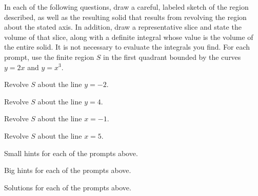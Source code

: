 \begin{activity} \label{A:6.2.3}  In each of the following questions, draw a careful, labeled sketch of the region described, as well as the resulting solid that results from revolving the region about the stated axis.  In addition, draw a representative slice and state the volume of that slice, along with a definite integral whose value is the volume of the entire solid.  It is not necessary to evaluate the integrals you find.  For each prompt, use the finite region $S$ in the first quadrant bounded by the curves $y = 2x$ and $y = x^3$.
\ba
	\item Revolve $S$ about the line $y = -2$.	
	\item Revolve $S$ about the line $y = 4$.
	\item Revolve $S$ about the line $x=-1$.	
	\item Revolve $S$ about the line $x = 5$.
\ea


\end{activity}

\begin{smallhint}
\ba
	\item Small hints for each of the prompts above.
\ea
\end{smallhint}
\begin{bighint}
\ba
	\item Big hints for each of the prompts above.
\ea
\end{bighint}
\begin{activitySolution}
\ba
	\item Solutions for each of the prompts above.
\ea
\end{activitySolution}
\aftera